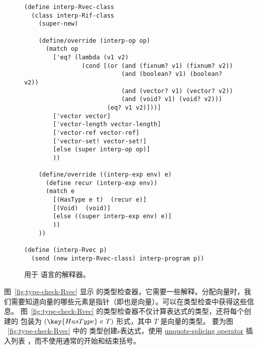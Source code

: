\documentclass[11pt]{book}
\begin{document}
\begin{figure}[tbp]
\begin{lstlisting}
(define interp-Rvec-class
  (class interp-Rif-class
    (super-new)

    (define/override (interp-op op)
      (match op
        ['eq? (lambda (v1 v2)
                (cond [(or (and (fixnum? v1) (fixnum? v2))
                           (and (boolean? v1) (boolean? v2))
                           (and (vector? v1) (vector? v2))
                           (and (void? v1) (void? v2)))
                       (eq? v1 v2)]))]
        ['vector vector]
        ['vector-length vector-length]
        ['vector-ref vector-ref]
        ['vector-set! vector-set!]
        [else (super interp-op op)]
        ))

    (define/override ((interp-exp env) e)
      (define recur (interp-exp env))
      (match e
        [(HasType e t)  (recur e)]
        [(Void)  (void)]
        [else ((super interp-exp env) e)]
        ))
    ))

(define (interp-Rvec p)
  (send (new interp-Rvec-class) interp-program p))
\end{lstlisting}
\caption{用于 \LangVec{} 语言的解释器。}
\label{fig:interp-Rvec}
\end{figure}

图~\ref{fig:type-check-Rvec} 显示 \LangVec{} 的类型检查器，它需要一些解释。分配向量时，我们需要知道向量的哪些元素是指针（即也是向量）。可以在类型检查中获得这些信息。
图~\ref{fig:type-check-Rvec} 的类型检查器不仅计算表达式的类型，还将每个创建的  包装为 $(\key{HasType}~e~T)$ 形式，其中 $T$ 是向量的类型。
%
要为图 ~\ref{fig:type-check-Rvec} 中的  类型创建s表达式，使用
\href{https://docs.racket-lang.org/reference/quasiquote.html}{unquote-splicing
  operator}  插入列表  ，而不使用通常的开始和结束括号。 
\end{document}
